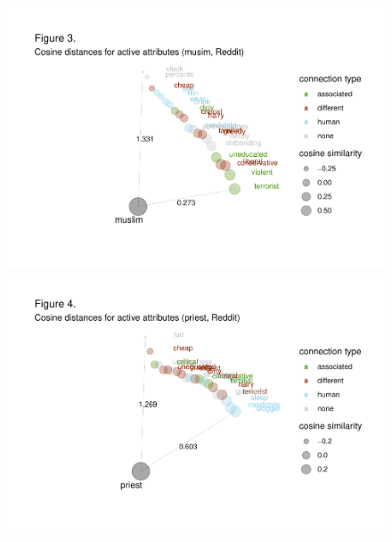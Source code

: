 \documentclass[
  12pt,
  dvipsnames,enabledeprecatedfontcommands]{scrartcl}
\begin{document}
\begin{center}
\begin{figure}[!htb]
   
  \begin{minipage}{0.48\textwidth}

\begin{center}\includegraphics[width=1\linewidth]{abstractESSLLI1_files/figure-latex/unnamed-chunk-3-1} \end{center}
\end{minipage}
   \begin {minipage}{0.48\textwidth}

\begin{center}\includegraphics[width=1\linewidth]{abstractESSLLI1_files/figure-latex/unnamed-chunk-4-1} \end{center}
   \end{minipage}
   
   
   

\end{figure}
\end{center}
\end{document}

